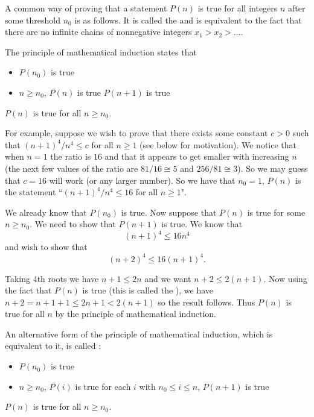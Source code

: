 A common way of proving that a statement $P(n)$ is true for all
integers $n$ after some threshold $n_0$ is as follows. It is called the
 and is equivalent to the
fact that there are no infinite chains of nonnegative integers $x_1 >
x_2 > \dots$.

The principle of mathematical induction states that  
\begin{itemize}
\item
$P(n_0)$ is true 
\item {} $n\geq n_0$,  $P(n)$ is true 
  $P(n+1)$ is true
\end{itemize}
 $P(n)$ is true for all $n\geq n_0$.

For example, suppose we wish to prove that there exists some constant
$c>0$ such that $(n+1)^4/n^4 \leq c$ for all $n\geq 1$ (see below for
motivation). We notice that when $n=1$ the ratio is $16$ and that it
appears to get smaller with increasing $n$ (the next few values of the
ratio are $81/16\cong 5$ and $256/81 \cong 3$). So we may guess
that $c=16$ will work (or any larger number). So we have that $n_0 =
1$, $P(n)$ is the statement ``$(n+1)^4/n^4 \leq 16$ for all $n\geq 1$".

We already know that $P(n_0)$ is true. Now suppose that $P(n)$ is true
for some $n\geq n_0$. We need to show that $P(n+1)$ is true. We know that
$$(n+1)^4 \leq 16 n^4$$ and wish to show that $$(n+2)^4 \leq 16 (n+1)^4.$$

Taking 4th roots we have $n+1 \leq 2 n$ and we want $n+2 \leq 2
(n+1)$. Now using the fact that $P(n)$ is true (this is called the
), we have $n+2 = n+1 + 1 \leq 2n + 1 <
2 (n+1)$ so the result follows. Thus $P(n)$ is true for all $n$ by the
principle of mathematical induction.


An alternative form of the principle of mathematical induction, which
is equivalent to it, is called :

\begin{itemize}
\item
$P(n_0)$ is true 
\item {} $n\geq n_0$,  $P(i)$ is true for each $i$ 
with $n_0 \leq i \leq n$,   $P(n+1)$ is true
\end{itemize}
 $P(n)$ is true for all $n\geq n_0$.


